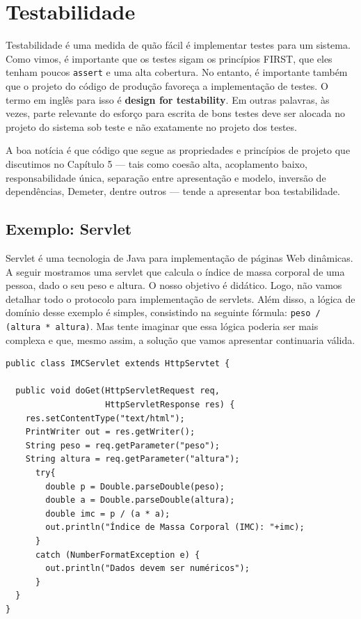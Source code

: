 \documentclass[
  11pt,
  twoside]{book}
\newcommand{\passthrough}[1]{#1}
\begin{document}
\hypertarget{testabilidade}{%
\section{Testabilidade}\label{testabilidade}}

 

Testabilidade é uma medida de quão fácil é implementar testes para um
sistema. Como vimos, é importante que os testes sigam os princípios
FIRST, que eles tenham poucos \passthrough{\lstinline!assert!} e uma
alta cobertura. No entanto, é importante também que o projeto do código
de produção favoreça a implementação de testes. O termo em inglês para
isso é \textbf{design for testability}. Em outras palavras, às vezes,
parte relevante do esforço para escrita de bons testes deve ser alocada
no projeto do sistema sob teste e não exatamente no projeto dos testes.

A boa notícia é que código que segue as propriedades e princípios de
projeto que discutimos no Capítulo 5 --- tais como coesão alta,
acoplamento baixo, responsabilidade única, separação entre apresentação
e modelo, inversão de dependências, Demeter, dentre outros --- tende a
apresentar boa testabilidade.

\hypertarget{exemplo-servlet}{%
\subsection{Exemplo: Servlet}\label{exemplo-servlet}}

Servlet é uma tecnologia de Java para implementação de páginas Web
dinâmicas. A seguir mostramos uma servlet que calcula o índice de massa
corporal de uma pessoa, dado o seu peso e altura. O nosso objetivo é
didático. Logo, não vamos detalhar todo o protocolo para implementação
de servlets. Além disso, a lógica de domínio desse exemplo é simples,
consistindo na seguinte fórmula:
\passthrough{\lstinline!peso / (altura * altura)!}. Mas tente imaginar
que essa lógica poderia ser mais complexa e que, mesmo assim, a solução
que vamos apresentar continuaria válida.

\begin{lstlisting}
public class IMCServlet extends HttpServtet {

  public void doGet(HttpServletRequest req, 
                    HttpServletResponse res) {
    res.setContentType("text/html");
    PrintWriter out = res.getWriter();
    String peso = req.getParameter("peso");
    String altura = req.getParameter("altura");
      try{
        double p = Double.parseDouble(peso);
        double a = Double.parseDouble(altura);
        double imc = p / (a * a);
        out.println("Índice de Massa Corporal (IMC): "+imc);
      }
      catch (NumberFormatException e) {
        out.println("Dados devem ser numéricos");
      }
  }
}  
\end{lstlisting}
\end{document}
